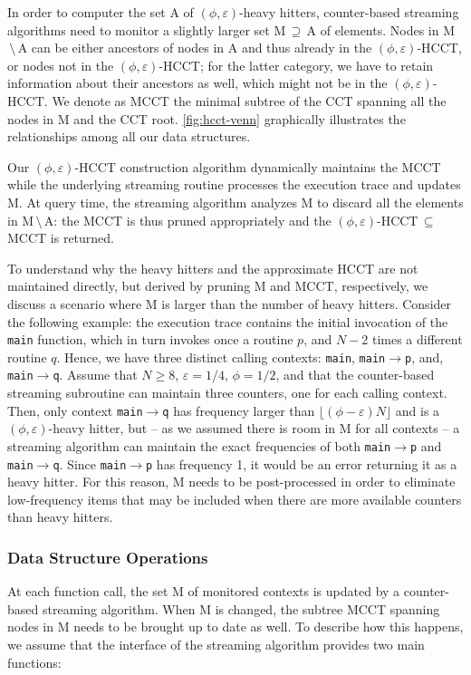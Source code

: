 In order to computer the set A of $(\phi,\varepsilon)$-heavy hitters, counter-based streaming algorithms need to monitor a slightly larger set M$\,\supseteq\,$A of elements. Nodes in M$\,\setminus\,$A can be either ancestors of nodes in A and thus already in the $(\phi,\varepsilon)$-HCCT, or nodes not in the $(\phi,\varepsilon)$-HCCT; for the latter category, we have to retain information about their ancestors as well, which might not be in the $(\phi,\varepsilon)$-HCCT. We denote as MCCT the minimal subtree of the CCT spanning all the nodes in M and the CCT root. \myfigure\ref{fig:hcct-venn} graphically illustrates the relationships among all our data structures.

Our $(\phi,\varepsilon)$-HCCT construction algorithm dynamically maintains the MCCT while the underlying streaming routine processes the execution trace and updates M. At query time, the streaming algorithm analyzes M to discard all the elements in M$\,\setminus\,$A: the MCCT is thus pruned appropriately and the $(\phi,\varepsilon)$-HCCT$\,\subseteq\,$MCCT is returned.

\begin{example}
To understand why the heavy hitters and the approximate HCCT are not maintained directly, but derived by pruning M and MCCT, respectively, we discuss a scenario where M is larger than the number of heavy hitters. Consider the following example: the execution trace contains the initial invocation of the {\tt main} function, which in turn invokes once a routine $p$, and $N-2$ times a different routine $q$. Hence, we have three distinct calling contexts: {\tt main}, {\tt main}$\rightarrow${\tt p}, and, {\tt main}$\rightarrow${\tt q}. Assume that $N\ge 8$, $\varepsilon=1/4$, $\phi=1/2$, and that the counter-based streaming subroutine can maintain three counters, one for each calling context. Then, only context {\tt main}$\rightarrow${\tt q} has frequency larger than $\lfloor(\phi-\varepsilon)N\rfloor$ and is a $(\phi,\varepsilon)$-heavy hitter, but -- as we assumed there is room in M for all contexts -- a streaming algorithm can maintain the exact frequencies of both {\tt main}$\rightarrow${\tt p} and {\tt main}$\rightarrow${\tt q}. Since {\tt main}$\rightarrow${\tt p} has frequency 1, it would be an error returning it as a heavy hitter. For this reason, M needs to be post-processed in order to eliminate low-frequency items that may be included when there are more available counters than heavy hitters.
\end{example}

\subsubsection*{Data Structure Operations}
At each function call, the set M of monitored contexts is updated by a counter-based streaming algorithm. When M is changed, the subtree MCCT spanning nodes in M needs to be brought up to date as well. To describe how this happens, we assume that the interface of the streaming algorithm provides two main functions:

